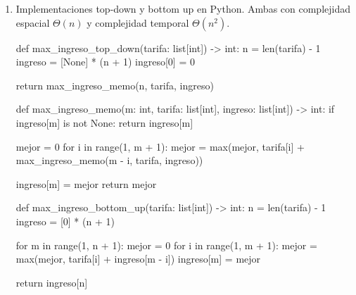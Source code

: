 \begin{enumerate}
\begin{center}
{%
}
\ifdim\wd0>\textwidth
  \resizebox{\textwidth}{!}{\copy0}
\else
  \makebox[\linewidth]{\copy0}
\fi

\medskip
Grafo de dependencias de \(R(m)\) para \(n=4\).
\end{center}

  Se necesitan todos los valores anteriores, por ende, no es posible optimizar el espacio por debajo de $\Theta(n)$, independientemente de si la implementación es top-down o bottom-up. \\

  También utilizando el grafo, es claro que resolver cada uno de los $n$ estados cuesta hasta $\Theta(n)$ trabajo (recorrer todos los vértices anteriores en el grafo, o recorrer el $\max$ en la relación de recurrencia). Ergo, la complejidad temporal es $\Theta(n^2)$: $\Theta(n)$ estados, cada uno con costo de $\Theta(n)$.

  \pagebreak

  \item Implementaciones top-down y bottom up en Python. Ambas con complejidad espacial $\Theta(n)$ y complejidad temporal $\Theta(n^2)$.

\begin{pseudocode}
def max_ingreso_top_down(tarifa: list[int]) -> int:
    n = len(tarifa) - 1
    ingreso = [None] * (n + 1)
    ingreso[0] = 0

    return max_ingreso_memo(n, tarifa, ingreso)

def max_ingreso_memo(m: int, tarifa: list[int], ingreso: list[int]) -> int:
    if ingreso[m] is not None:
        return ingreso[m]

    mejor = 0
    for i in range(1, m + 1):
        mejor = max(mejor, tarifa[i] + max_ingreso_memo(m - i, tarifa, ingreso))

    ingreso[m] = mejor
    return mejor
\end{pseudocode}

\begin{pseudocode}
def max_ingreso_bottom_up(tarifa: list[int]) -> int:
    n = len(tarifa) - 1
    ingreso = [0] * (n + 1)

    for m in range(1, n + 1):
        mejor = 0
        for i in range(1, m + 1):
            mejor = max(mejor, tarifa[i] + ingreso[m - i])
        ingreso[m] = mejor

    return ingreso[n]
\end{pseudocode}
\end{enumerate}
